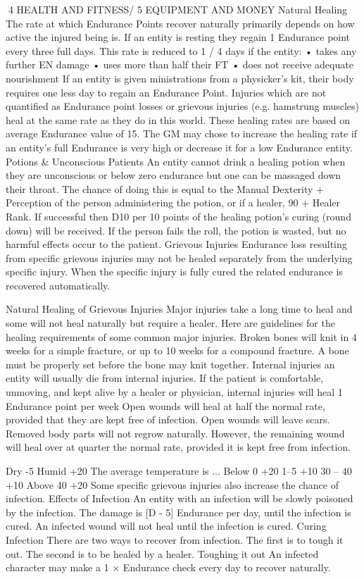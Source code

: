 \documentclass[a4paper]{article}
\begin{document}
\begin{multicols}{3}
4 HEALTH AND FITNESS/ 5 EQUIPMENT AND MONEY
Natural Healing
The rate at which Endurance Points recover naturally primarily depends on how active the injured
being is.
If an entity is resting they regain 1 Endurance point
every three full days.
This rate is reduced to 1 / 4 days if the entity:
• takes any further EN damage
• uses more than half their FT
• does not receive adequate nourishment
If an entity is given ministrations from a
physicker’s kit, their body requires one less day to
regain an Endurance Point.
Injuries which are not quantified as Endurance
point losses or grievous injuries (e.g. hamstrung
muscles) heal at the same rate as they do in this
world.
These healing rates are based on average Endurance value of 15. The GM may chose to increase
the healing rate if an entity’s full Endurance is very
high or decrease it for a low Endurance entity.
Potions \& Unconscious Patients
An entity cannot drink a healing potion when they
are unconscious or below zero endurance but one
can be massaged down their throat. The chance of
doing this is equal to the Manual Dexterity + Perception of the person administering the potion, or if
a healer, 90 + Healer Rank. If successful then D10
per 10 points of the healing potion’s curing (round
down) will be received. If the person fails the roll,
the potion is wasted, but no harmful effects occur
to the patient.
Grievous Injuries
Endurance loss resulting from specific grievous
injuries may not be healed separately from the
underlying specific injury. When the specific injury is fully cured the related endurance is recovered automatically.

Natural Healing of Grievous Injuries
Major injuries take a long time to heal and some
will not heal naturally but require a healer. Here
are guidelines for the healing requirements of some
common major injuries.
Broken bones will knit in 4 weeks for a simple
fracture, or up to 10 weeks for a compound fracture. A bone must be properly set before the bone
may knit together.
Internal injuries an entity will usually die from
internal injuries. If the patient is comfortable, unmoving, and kept alive by a healer or physician,
internal injuries will heal 1 Endurance point per
week
Open wounds will heal at half the normal rate,
provided that they are kept free of infection. Open
wounds will leave scars.
Removed body parts will not regrow naturally.
However, the remaining wound will heal over at
quarter the normal rate, provided it is kept free
from infection.

Dry
-5%
Humid
+20%
The average temperature is ...
Below 0
+20%
1–5
+10%
30 – 40
+10%
Above 40
+20%
Some specific grievous injuries also increase the
chance of infection.
Effects of Infection
An entity with an infection will be slowly poisoned
by the infection. The damage is [D - 5] Endurance
per day, until the infection is cured. An infected
wound will not heal until the infection is cured.
Curing Infection
There are two ways to recover from infection. The
first is to tough it out. The second is to be healed
by a healer.
Toughing it out An infected character may make a
1 × Endurance check every day to recover naturally.


\end{multicols}
\end{document}

